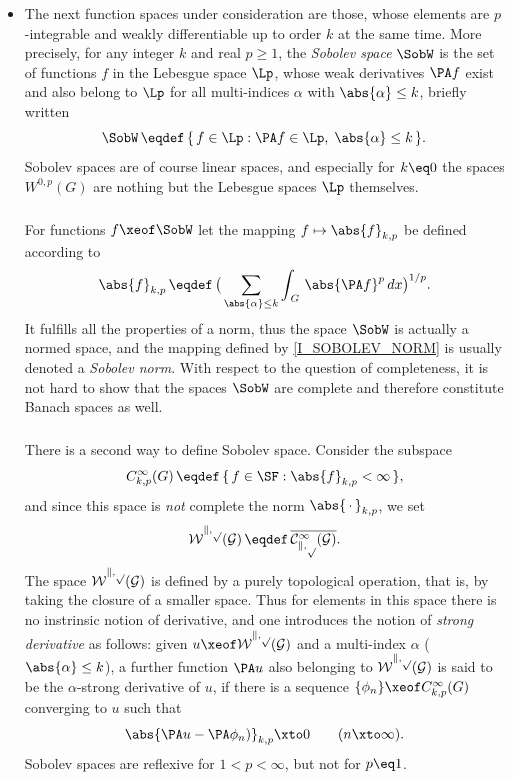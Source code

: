 \documentclass[11pt,twoside]{article}
\def\G{G}
\begin{document}
\begin{itemize}[leftmargin=12pt,itemsep=5pt]
\begin{itemize}[leftmargin=17pt]
\item[(a)] The next function spaces under consideration are those,
whose elements are $p$-integrable and weakly differentiable up to order $k$
at the same time.
More precisely,
for any integer $k$ and real $p \geq 1$,
the \textit{Sobolev space} $\SobW$ is the set
of functions $f$ in the Lebesgue space $\Lp$,
whose weak derivatives $\PA f$ exist and also belong to $\Lp$
for all multi-indices $\alpha$ with $ \abs{\alpha} \leq k$,
briefly written
\[
\SobW
\, \eqdef \,
\{\,f \in \Lp: \PA f \in \Lp, \; \abs{\alpha} \leq k \, \}.
\]
Sobolev spaces are of course linear spaces,
and especially for $k \eq 0$
the spaces $W^{0,p}(\G)$ are nothing but the Lebesgue spaces $\Lp$ themselves.

\subparagraph{} %
For functions $f \xeof \SobW$ let the mapping $f \mapsto \abs{f} _{k,p}$
be defined according to
\begin{equation}\label{I_SOBOLEV_NORM}
\abs{f} _{k,p} \, \eqdef \,
\big(
\sum_{\abs{\alpha } \leq k}
\int_{\,\G} \, \abs{\PA f} ^p \, dx
\big) ^{1/p}.
\end{equation}
It fulfills all the properties of a norm,
thus the space $\SobW$ is actually a normed space,
and the mapping defined by \eqref{I_SOBOLEV_NORM}
is usually denoted a \textit{Sobolev norm}.
With respect to the question of completeness,
it is not hard to show that
the spaces $\SobW$ are complete
and therefore constitute Banach spaces as well.

\subparagraph{} %
There is a second way to define Sobolev space.
Consider the subspace
\[
C_{k,p}^{\infty}(\G) \, \eqdef \, \{\, f \in \SF: \abs{f} _{k,p} < \infty \,\},
\]
and since this space is \textit{not} complete
{\wrt} the norm $\abs{\,\cdot\,} _{k,p}$,
we set
\[
\cal{W}^{k,p}(\G) \, \eqdef \, \overline{C_{k,p}^{\infty}(\G)}.
\]
The space $\cal{W}^{k,p}(\G)$ is defined by a purely topological operation,
that is,
by taking the closure of a smaller space.
Thus for elements in this space there is no instrinsic notion of derivative,
and one introduces the notion of \textit{strong derivative} as follows:
given $u \xeof \cal{W}^{k,p}(\G)$
and a multi-index $\alpha$ ($\abs{\alpha} \leq k$),
a further function $\PA u$ also belonging to $\cal{W}^{k,p}(\G)$
is said to be the $\alpha$-strong derivative of $u$,
if there is a sequence $\{\phi_n\} \xeof C_{k,p}^{\infty}(\G)$
converging to $u$ such that
\[
\abs{\PA u - \PA \phi_n)} _{k,p} \xto 0 \quad \quad (n \xto \infty).
\]
Sobolev spaces are reflexive for $1 < p < \infty$,
but not for $p \eq 1$.


\end{itemize}
\end{itemize}
\end{document}
